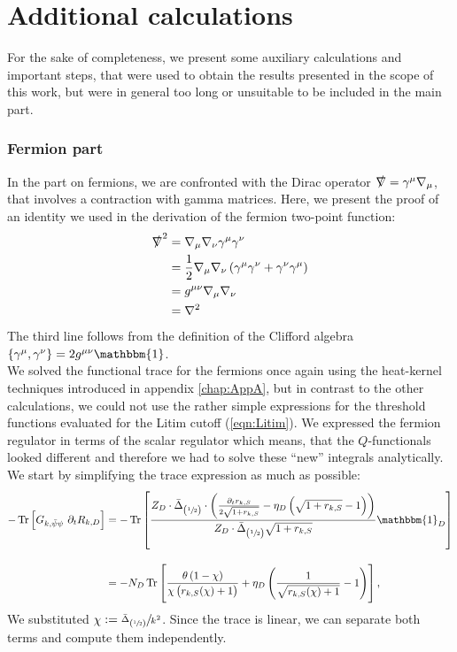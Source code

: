 \chapter{Additional calculations}\label{chap:AppB}
For the sake of completeness, we present some auxiliary calculations and important steps, that were used to obtain the results presented in the scope of this work, but were in general too long or unsuitable to be included in the main part.
\subsection*{Fermion part}
In the part on fermions, we are confronted with the Dirac operator $\slashed{\nabla}=\gamma^{\mu}\nabla_{\mu}$, that involves a contraction with gamma matrices. Here, we present the proof of an identity we used in the derivation of the fermion two-point function:
\begin{equation}
	\begin{aligned}
		\slashed{\nabla}^2 &= \nabla_{\mu}\nabla_{\nu}\gamma^{\mu}\gamma^{\nu} \\
		&= \frac{1}{2}\nabla_{\mu}\nabla_{\nu}\left(\gamma^{\mu}\gamma^{\nu}+\gamma^{\nu}\gamma^{\mu}\right) \\
		&=  g^{\mu\nu}\nabla_{\mu}\nabla_{\nu}\\
		&= \nabla^2
	\end{aligned}
\end{equation} 
The third line follows from the definition of the Clifford algebra $\left\{\gamma^{\mu},\gamma^{\nu}\right\} = 2g^{\mu\nu}\mathbbm{1}$. \\

We solved the functional trace for the fermions once again using the heat-kernel techniques introduced in appendix \ref{chap:AppA}, but in contrast to the other calculations, we could not use the rather simple expressions for the threshold functions evaluated for the Litim cutoff (\ref{eqn:Litim}). We expressed the fermion regulator in terms of the scalar regulator which means, that the $Q$-functionals looked different and therefore we had to solve these \enquote{new} integrals analytically. We start by simplifying the trace expression as much as possible:
\begin{equation}
\begin{aligned}
	-\tr{G_{k, \bar{\psi}\psi}\ \partial_t R_{k,D}} &=-\tr{\frac{Z_D\cdot\bar{\Delta}_{\left(\sfrac{1}{2}\right)}\cdot\left(\frac{\partial_t r_{k,S}}{2\sqrt{1+r_{k, S}}} - \eta_D\left(\sqrt{1+r_{k,S}} -1\right)\right)}{Z_D\cdot\bar{\Delta}_{\left(\sfrac{1}{2}\right)}\sqrt{1 + r_{k,S}}}\mathbbm{1}_D} \\[10pt]
	&= -N_D\tr{\frac{\theta\left(1-\chi\right)}{\chi\left(r_{k,S}(\chi)+1\right)} + \eta_D\left(\frac{1}{\sqrt{r_{k,S}(\chi) + 1}}-1\right)},
	\end{aligned}
\end{equation}
We substituted $\chi := \sfrac{\bar{\Delta}_{\left(\sfrac{1}{2}\right)}}{k^2}$. Since the trace is linear, we can separate both terms and compute them independently.
